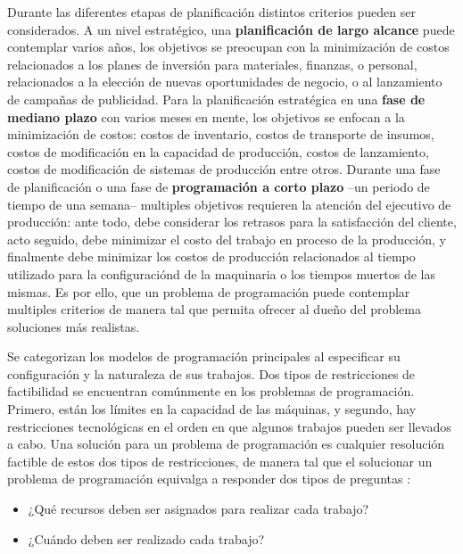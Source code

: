 \documentclass[spanish,draft,12pt,headsepline,footsepline,paper=letter]{scrreprt}
\begin{document}
Durante las diferentes etapas de planificación distintos criterios pueden ser considerados. A un nivel estratégico, una \textbf{planificación de largo alcance} puede contemplar varios años, los objetivos se preocupan con la minimización de costos relacionados a los planes de inversión para materiales, finanzas, o personal, relacionados a la elección de nuevas oportunidades de negocio, o al lanzamiento de campañas de publicidad. Para la planificación estratégica en una \textbf{fase de mediano plazo} con varios meses en mente, los objetivos se enfocan a la minimización de costos: costos de inventario, costos de transporte de insumos, costos de modificación en la capacidad de producción, costos de lanzamiento, costos de modificación de sistemas de producción entre otros. Durante una fase de planificación o una fase de \textbf{programación a corto plazo} –un periodo de tiempo de una semana– multiples objetivos requieren la atención del ejecutivo de producción: ante todo, debe considerar los retrasos para la satisfacción del cliente, acto seguido, debe minimizar el costo del trabajo en proceso de la producción, y finalmente debe minimizar los costos de producción relacionados al tiempo utilizado para la configuraciónd de la maquinaria o los tiempos muertos de las mismas. Es por ello, que un problema de programación puede contemplar multiples criterios de manera tal que permita ofrecer al dueño del problema soluciones más realistas\citep[p.~1]{TKindt2002}.

Se categorizan los modelos de programación principales al especificar su configuración y la naturaleza de sus trabajos. Dos tipos de restricciones de factibilidad se encuentran comúnmente en los problemas de programación. Primero, están los límites en la capacidad de las máquinas, y segundo, hay restricciones tecnológicas en el orden en que algunos trabajos pueden ser llevados a cabo. Una solución para un problema de programación es cualquier resolución factible de estos dos tipos de restricciones, de manera tal que el solucionar un problema de programación equivalga a responder dos tipos de preguntas \citep[p.~4]{Baker2009}:

\begin{itemize}
\setlength{\itemsep}{0cm}%
\setlength{\parskip}{0cm}%
\item¿Qué recursos deben ser asignados para realizar cada trabajo?
\item¿Cuándo deben ser realizado cada trabajo?
\end{itemize}
\end{document}
